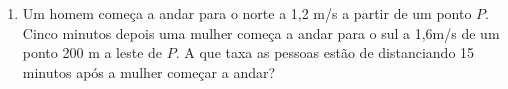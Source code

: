 \documentclass[a4paper,5pt]{amsbook}
\newcommand{\ds}{\displaystyle}
\begin{document}
\begin{enumerate}
    \vspace{0.5cm}
    \item Um homem come\c{c}a a andar para o norte a 1,2 m/s a partir de um ponto
        $P$. Cinco minutos depois uma mulher come\c{c}a a andar para o sul a
        1,6m/s de um ponto 200 m a leste de $P$. A que taxa as pessoas est\~ao
        de distanciando 15 minutos ap\'os a mulher come\c{c}ar a andar?

\end{enumerate}
\end{document}
